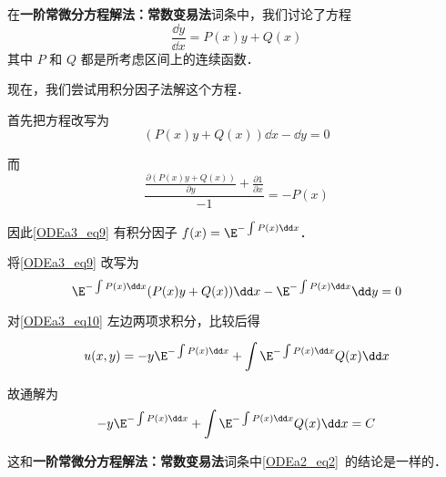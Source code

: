 \begin{example}{}
在\textbf{一阶常微分方程解法：常数变易法}词条中，我们讨论了方程
\begin{equation}
\frac{\dd y}{\dd x}=P(x)y+Q(x)
\end{equation}
其中 $P$ 和 $Q$ 都是所考虑区间上的连续函数．

现在，我们尝试用积分因子法解这个方程．

首先把方程改写为
\begin{equation}\label{ODEa3_eq9}
(P(x)y+Q(x))\dd x-\dd y=0
\end{equation}

而
\begin{equation}
\frac{\frac{\partial (P(x)y+Q(x))}{\partial y}+\frac{\partial 1}{\partial x}}{-1}=-P(x)
\end{equation}

因此\autoref{ODEa3_eq9} 有积分因子 $f(x)=\E^{-\int P(x)\dd x}
$．

将\autoref{ODEa3_eq9} 改写为
\begin{equation}\label{ODEa3_eq10}
\E^{-\int P(x)\dd x}(P(x)y+Q(x))\dd x-\E^{-\int P(x)\dd x}\dd y=0
\end{equation}

对\autoref{ODEa3_eq10} 左边两项求积分，比较后得

\begin{equation}
u(x, y)=-y\E^{-\int P(x)\dd x}+\int  \E^{-\int P(x)\dd x}Q(x)  \dd x
\end{equation}

故通解为
\begin{equation}
-y\E^{-\int P(x)\dd x}+\int  \E^{-\int P(x)\dd x}Q(x)  \dd x=C
\end{equation}

这和\textbf{一阶常微分方程解法：常数变易法}词条中\autoref{ODEa2_eq2}~的结论是一样的．

\end{example}














